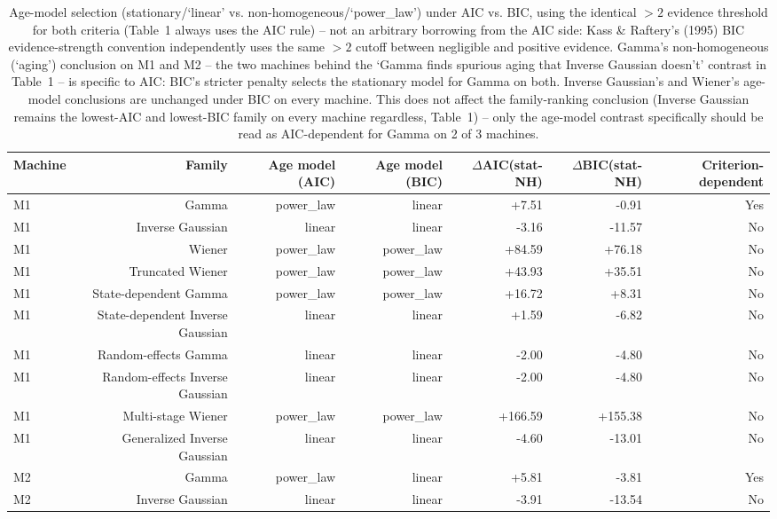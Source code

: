 \begin{table}[t]
\centering
\caption{Age-model selection (stationary/`linear' vs. non-homogeneous/`power\_law') under AIC vs. BIC, using the identical $>2$ evidence threshold for both criteria (Table~1 always uses the AIC rule) -- not an arbitrary borrowing from the AIC side: Kass \& Raftery's (1995) BIC evidence-strength convention independently uses the same $>2$ cutoff between negligible and positive evidence. Gamma's non-homogeneous (`aging') conclusion on M1 and M2 -- the two machines behind the `Gamma finds spurious aging that Inverse Gaussian doesn't' contrast in Table~1 -- is specific to AIC: BIC's stricter penalty selects the stationary model for Gamma on both. Inverse Gaussian's and Wiener's age-model conclusions are unchanged under BIC on every machine. This does not affect the family-ranking conclusion (Inverse Gaussian remains the lowest-AIC and lowest-BIC family on every machine regardless, Table~1) -- only the age-model contrast specifically should be read as AIC-dependent for Gamma on 2 of 3 machines.}
\label{tab:age-model-criterion-sensitivity}
\begin{tabular}{lrrrrrr}
\toprule
Machine & Family & Age model (AIC) & Age model (BIC) & $\Delta$AIC(stat-NH) & $\Delta$BIC(stat-NH) & Criterion-dependent \\
\midrule
M1 & Gamma & power\_law & linear & +7.51 & -0.91 & Yes \\
M1 & Inverse Gaussian & linear & linear & -3.16 & -11.57 & No \\
M1 & Wiener & power\_law & power\_law & +84.59 & +76.18 & No \\
M1 & Truncated Wiener & power\_law & power\_law & +43.93 & +35.51 & No \\
M1 & State-dependent Gamma & power\_law & power\_law & +16.72 & +8.31 & No \\
M1 & State-dependent Inverse Gaussian & linear & linear & +1.59 & -6.82 & No \\
M1 & Random-effects Gamma & linear & linear & -2.00 & -4.80 & No \\
M1 & Random-effects Inverse Gaussian & linear & linear & -2.00 & -4.80 & No \\
M1 & Multi-stage Wiener & power\_law & power\_law & +166.59 & +155.38 & No \\
M1 & Generalized Inverse Gaussian & linear & linear & -4.60 & -13.01 & No \\
M2 & Gamma & power\_law & linear & +5.81 & -3.81 & Yes \\
M2 & Inverse Gaussian & linear & linear & -3.91 & -13.54 & No \\

\end{tabular}
\end{table}
